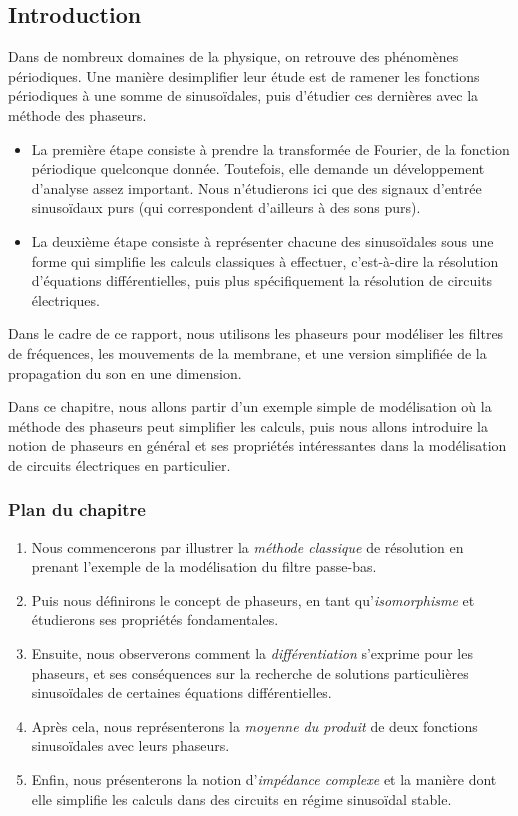 \subsection*{Introduction}

Dans de nombreux domaines de la physique,
on retrouve des phénomènes périodiques.
Une manière desimplifier leur étude
est de ramener les fonctions périodiques à une somme de sinusoïdales,
puis d'étudier ces dernières avec la méthode des phaseurs.
\begin{itemize}
    \item La première étape consiste à prendre la transformée de Fourier,
        de la fonction périodique quelconque donnée.
        Toutefois, elle demande un développement d'analyse assez important.
        Nous n'étudierons ici que des signaux d'entrée sinusoïdaux purs
        (qui correspondent d'ailleurs à des sons purs).
    \item La deuxième étape consiste à représenter chacune des sinusoïdales
        sous une forme qui simplifie les calculs classiques à effectuer,
        c'est-à-dire la résolution d'équations différentielles,
        puis plus spécifiquement la résolution de circuits électriques.
\end{itemize}

Dans le cadre de ce rapport,
nous utilisons les phaseurs pour modéliser les filtres de fréquences,
les mouvements de la membrane,
et une version simplifiée de la propagation du son en une dimension.

Dans ce chapitre, nous allons partir d'un exemple simple de modélisation
où la méthode des phaseurs peut simplifier les calculs,
puis nous allons introduire la notion de phaseurs
en général et ses propriétés
intéressantes dans la modélisation de circuits électriques en particulier.

\subsubsection*{Plan du chapitre}
\begin{enumerate}
    \item Nous commencerons par illustrer la \emph{méthode classique}
        de résolution en prenant l'exemple de la modélisation
        du filtre passe-bas.
    \item Puis nous définirons le concept de phaseurs, 
        en tant qu'\emph{isomorphisme} et étudierons
        ses propriétés fondamentales.
    \item Ensuite, nous observerons comment la \emph{différentiation}
        s'exprime pour les phaseurs, et ses conséquences sur
        la recherche de solutions particulières sinusoïdales
        de certaines équations différentielles.
    \item Après cela, nous représenterons la \emph{moyenne du produit}
        de deux fonctions sinusoïdales avec leurs phaseurs.
    \item Enfin, nous présenterons la notion d'\emph{impédance complexe}
        et la manière dont elle simplifie les calculs
        dans des circuits en régime sinusoïdal stable.
\end{enumerate}
